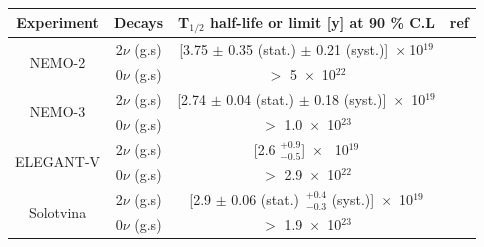 \documentclass[main.tex]{subfiles}
\begin{document}
\begin{table}[h!]
\begin{center}
\begin{tabular}{c|c|c|c}
\toprule
Experiment & Decays & T$_{\text{1}/\text{2}}$ half-life or limit [y] at 90 \% C.L & ref\\[0.1cm]
\midrule[0.05cm]

\multirow{2}{*}{NEMO-2} & 2$\nu$ (g.s) & [3.75 $\pm$ 0.35 (stat.) $\pm$ 0.21 (syst.)]~$\times~$10$^{\text{19}}$&\cite{NEMO2:Cd116}\\[0.1cm]
                        & 0$\nu$ (g.s) & $>$ 5~$\times$~10$^{\text{22}}$ &\\[0.1cm]
                                               
\midrule   
\multirow{2}{*}{NEMO-3}  & 2$\nu$ (g.s) & [2.74 $\pm$ 0.04 (stat.) $\pm$ 0.18 (syst.)]~$\times$~10$^{\text{19}}$&\cite{Arnold2016bed}\\[0.1cm]
                        & 0$\nu$ (g.s) & $>$ 1.0~$\times$~10$^{\text{23}}$ &\\[0.1cm]
                    
\midrule                        

\multirow{2}{*}{ELEGANT-V}  & 2$\nu$ (g.s) & [2.6 $^{+\text{0.9}}_{-\text{0.5}}$]~$\times$~ 10$^{\text{19}}$&\cite{ElegantV-1}\\[0.1cm]
                           & 0$\nu$ (g.s) & $>$ 2.9~$\times$~10$^{\text{22}}$ &\\[0.1cm]
                        
                        
\midrule


                           
                           
\multirow{2}{*}{Solotvina} & 2$\nu$ (g.s) & [2.9 $\pm$ 0.06 (stat.)~$^{+\text{0.4}}_{-\text{0.3}}$ (syst.)]~$\times$~10$^{\text{19}}$&\cite{Solotvina}\\[0.1cm]
                           & 0$\nu$ (g.s) & $>$ 1.9~$\times$~10$^{\text{23}}$ &\\[0.1cm]
                           

\midrule


\end{tabular}
\end{center}
\end{table}
\end{document}

